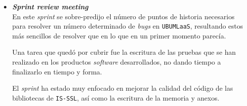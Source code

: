 \begin{itemize}
\item \textbf{\textit{Sprint review meeting}}\\
En este \textit{sprint} se sobre-predijo el número de puntos de historia necesarios para resolver un número determinado de \textit{bugs} en \texttt{UBUMLaaS}, resultando estos más sencillos de resolver que en lo que en un primer momento parecía. 

Una tarea que quedó por cubrir fue la escritura de las pruebas que se han realizado en los productos \textit{software} desarrollados, no dando tiempo a finalizarlo en tiempo y forma.

El \textit{sprint} ha estado muy enfocado en mejorar la calidad del código de las bibliotecas de \texttt{IS-SSL}, así como la escritura de la memoria y anexos.

\end{itemize}

